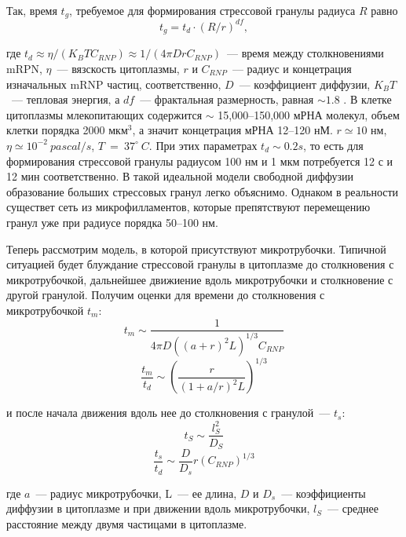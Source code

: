\documentclass[14pt,a4paper]{extarticle}
\begin{document}
	Так, время $t_g$, требуемое для формирования стрессовой гранулы радиуса $R$ равно
\begin{equation} \label{eq:tg}
	t_g = t_d \cdot (R/r)^{df},
\end{equation}

где $t_d \approx \eta / (K_B T C_{RNP}) \approx 1 / (4 \pi D r C_{RNP})$~--- время между столкновениями mRPN, $\eta$~--- вязскость цитоплазмы, $r$ и $C_{RNP}$~--- радиус и концетрация изначальных mRNP частиц, соответственно, $D$~--- коэффициент диффузии, $K_B T$~--- тепловая энергия, а $df$~--- фрактальная размерность, равная $\sim1.8$ \cite{Weitz:1986pd}. В клетке цитоплазмы млекопитающих содержится  $\sim$ 15,000--150,000 мРНА молекул, объем клетки порядка 2000 мкм$^3$, а значит концетрация мРНА 12--120 нМ. $r \simeq 10$ нм, $\eta \simeq 10^{-2}~pascal/s$, $T~=~37^{\circ}~C$.
При этих параметрах $t_d \sim 0.2s$, то есть для формирования стрессовой гранулы радиусом 100 нм и 1 мкм потребуется 12 с и 12 мин соответственно. В такой идеальной модели свободной диффузии образование больших стрессовых гранул легко объяснимо. Однаком в реальности существет сеть из микрофилламентов, которые препятствуют перемещению гранул уже при радиусе порядка 50--100 нм.

	Теперь рассмотрим модель, в которой присутствуют микротрубочки. Типичной ситуацией будет блуждание стрессовой гранулы в цитоплазме до столкновения с микротрубочкой, дальнейшее движиение вдоль микротрубочки и столкновение с другой гранулой. Получим оценки для времени до столкновения с микротрубочкой $t_m$:
\begin{equation} \label{eq:tm}
t_m \sim \frac{1}{4 \pi D \left((a+r)^2 L \right)^{1/3} C_{RNP}}
\end{equation}
\begin{equation}
\frac{t_m}{t_d} \sim \left( \frac{r}{(1+a/r)^2 L} \right) ^{1/3}
\end{equation}

и после начала движения вдоль нее до столкновения с гранулой~--- $t_s$:
\begin{equation} \label{eq:ts}
t_S \sim \frac{l_S^2}{D_S}
\end{equation}
\begin{equation}
\frac{t_s}{t_d} \sim \frac{D}{D_s} r (C_{RNP})^{1/3}
\end{equation}

где $a$~--- радиус микротрубочки, L~--- ее длина, $D$ и $D_s$~--- коэффициенты диффузии в цитоплазме и при движении вдоль микротрубочки, $l_S$~--- среднее расстояние между двумя частицами в цитоплазме.	
\end{document}
